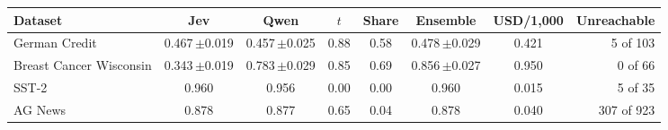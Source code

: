 \begin{tabular}{lccccccr}
\toprule
Dataset & Jev & Qwen & $t$ & Share & Ensemble & USD/1,000 & Unreachable \\
\midrule
German Credit & 0.467\,{\scriptsize$\pm$0.019} & 0.457\,{\scriptsize$\pm$0.025} & 0.88 & 0.58 & 0.478\,{\scriptsize$\pm$0.029} & 0.421 & 5 of 103 \\
Breast Cancer Wisconsin & 0.343\,{\scriptsize$\pm$0.019} & 0.783\,{\scriptsize$\pm$0.029} & 0.85 & 0.69 & 0.856\,{\scriptsize$\pm$0.027} & 0.950 & 0 of 66 \\
SST-2 & 0.960 & 0.956 & 0.00 & 0.00 & 0.960 & 0.015 & 5 of 35 \\
AG News & 0.878 & 0.877 & 0.65 & 0.04 & 0.878 & 0.040 & 307 of 923 \\
\bottomrule
\end{tabular}
